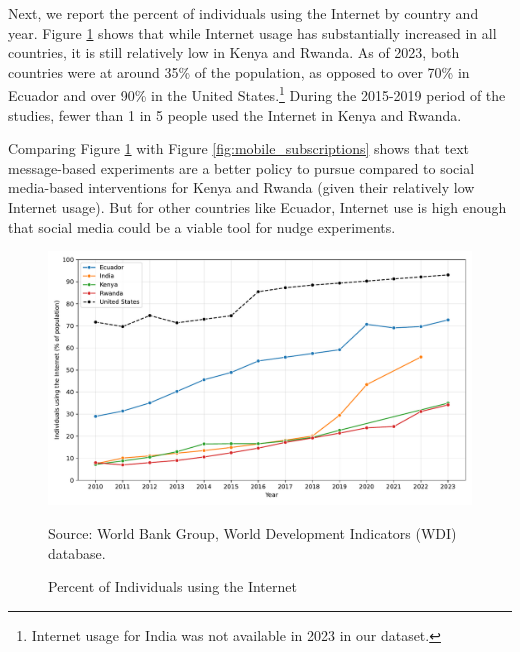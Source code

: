 \documentclass[12pt]{article}
\begin{document}
Next, we report the percent of individuals using the Internet by country and year. Figure \ref{fig:internet_use} shows that while Internet usage has substantially increased in all countries, it is still relatively low in Kenya and Rwanda. As of 2023, both countries were at around 35\% of the population, as opposed to over 70\% in Ecuador and over 90\% in the United States.\footnote{Internet usage for India was not available in 2023 in our dataset.} During the 2015-2019 period of the \textcite{fabregas_digital_2025} studies, fewer than 1 in 5 people used the Internet in Kenya and Rwanda.

Comparing Figure \ref{fig:internet_use} with Figure \ref{fig:mobile_subscriptions} shows that text message-based experiments are a better policy to pursue compared to social media-based interventions for Kenya and Rwanda (given their relatively low Internet usage). But for other countries like Ecuador, Internet use is high enough that social media could be a viable tool for nudge experiments.

\begin{figure}[H]
    \centering
    \caption{Percent of Individuals using the Internet}
    \includegraphics[width=\textwidth]{../output/individuals_using_internet.pdf}
    \begin{minipage}{0.9\textwidth}
    \footnotesize
    Source: World Bank Group, World Development Indicators (WDI) database. 
    \end{minipage}
    \label{fig:internet_use}
\end{figure}
\end{document}
